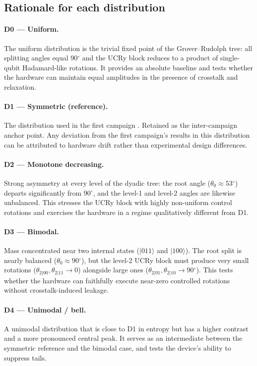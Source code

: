 \documentclass[11pt,a4paper]{article}
\providecommand{\dg}{\ensuremath{{}^{\circ}}}
\renewcommand{\ket}[1]{|#1\rangle}
\begin{document}
\subsection{Rationale for each distribution}

\paragraph{D0 — Uniform.}
The uniform distribution is the trivial fixed point of the
Grover--Rudolph tree: all splitting angles equal $90\dg{}$ and
the UCRy block reduces to a product of single-qubit Hadamard-like
rotations. It provides an absolute baseline and tests whether the
hardware can maintain equal amplitudes in the presence of crosstalk
and relaxation.

\paragraph{D1 — Symmetric (reference).}
The distribution used in the first campaign \cite{ProtocolV1}.
Retained as the inter-campaign anchor point. Any deviation from the
first campaign's results in this distribution can be attributed to
hardware drift rather than experimental design differences.

\paragraph{D2 — Monotone decreasing.}
Strong asymmetry at every level of the dyadic tree: the root angle
($\theta_0 \approx 53\dg{}$) departs significantly from $90\dg{}$,
and the level-1 and level-2 angles are likewise unbalanced. This
stresses the UCRy block with highly non-uniform control rotations
and exercises the hardware in a regime qualitatively different from
D1.

\paragraph{D3 — Bimodal.}
Mass concentrated near two internal states ($\ket{011}$ and
$\ket{100}$). The root split is nearly balanced ($\theta_0 \approx
90\dg{}$), but the level-2 UCRy block must produce very small
rotations ($\theta_{2|00}, \theta_{2|11} \to 0$) alongside large
ones ($\theta_{2|01}, \theta_{2|10} \to 90\dg{}$). This tests
whether the hardware can faithfully execute near-zero controlled
rotations without crosstalk-induced leakage.

\paragraph{D4 — Unimodal / bell.}
A unimodal distribution that is close to D1 in entropy but has a
higher contrast and a more pronounced central peak. It serves as
an intermediate between the symmetric reference and the bimodal
case, and tests the device's ability to suppress tails.
\end{document}

